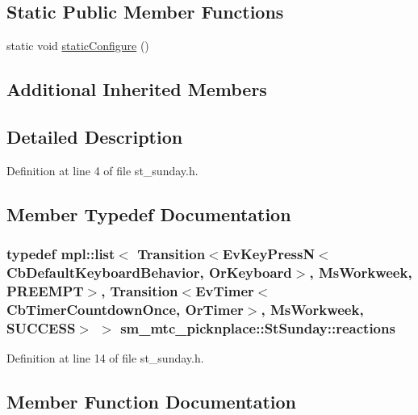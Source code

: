\subsection*{Static Public Member Functions}
\begin{DoxyCompactItemize}
\item 
static void \hyperlink{structsm__mtc__picknplace_1_1StSunday_a8a9db97f7b92e7de36964338c8025c5d}{static\+Configure} ()
\end{DoxyCompactItemize}
\subsection*{Additional Inherited Members}


\subsection{Detailed Description}


Definition at line 4 of file st\+\_\+sunday.\+h.



\subsection{Member Typedef Documentation}
\subsubsection[{\texorpdfstring{reactions}{reactions}}]{\setlength{\rightskip}{0pt plus 5cm}typedef mpl\+::list$<$ Transition$<$Ev\+Key\+PressN$<$Cb\+Default\+Keyboard\+Behavior, {\bf Or\+Keyboard}$>$, {\bf Ms\+Workweek}, {\bf P\+R\+E\+E\+M\+PT}$>$, Transition$<$Ev\+Timer$<$Cb\+Timer\+Countdown\+Once, {\bf Or\+Timer}$>$, {\bf Ms\+Workweek}, {\bf S\+U\+C\+C\+E\+SS}$>$ $>$ {\bf sm\+\_\+mtc\+\_\+picknplace\+::\+St\+Sunday\+::reactions}}\hypertarget{structsm__mtc__picknplace_1_1StSunday_af680bd1949980af99c6ac5abea3102e7}{}\label{structsm__mtc__picknplace_1_1StSunday_af680bd1949980af99c6ac5abea3102e7}


Definition at line 14 of file st\+\_\+sunday.\+h.



\subsection{Member Function Documentation}
